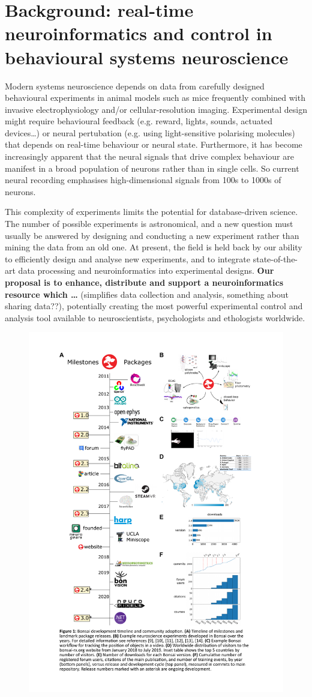 
\section{Background: real-time neuroinformatics and control in behavioural systems
  neuroscience}

Modern systems neuroscience depends on data from carefully designed behavioural experiments in
animal models such as mice frequently combined with invasive electrophysiology and/or
cellular-resolution imaging.  Experimental design might require behavioural feedback (e.g. reward,
lights, sounds, actuated devices\dots) or neural pertubation (e.g. using light-sensitive polarising
molecules) that depends on real-time behaviour or neural state.
%
Furthermore, it has become increasingly apparent that the neural signals that drive complex
behaviour are manifest in a broad population of neurons rather than in single cells.  So current
neural recording emphasises high-dimensional signals from 100s to 1000s of neurons.   

This complexity of experiments limits the potential for database-driven science.  The number of
possible experiments is astronomical, and a new question must usually be answered by designing and
conducting a new experiment rather than mining the data from an old one.
%
At present, the field is held back by our ability to efficiently design and analyse new experiments,
and to integrate state-of-the-art data processing and neuroinformatics into experimental designs.
%
\textbf{Our proposal is to enhance, distribute and support a neuroinformatics resource which \dots}
(simplifies data collection and analysis, something about sharing data??), potentially creating the most powerful experimental control and analysis tool available to neuroscientists, psychologists and ethologists worldwide.

\setlength{\columnsep}{1em}
\begin{figure}
  \includegraphics[width=0.5\columnwidth,viewport=65 50 500 800,clip]{figures/bonsai.pdf}
  \label{fig:bonsai}
\end{figure}

